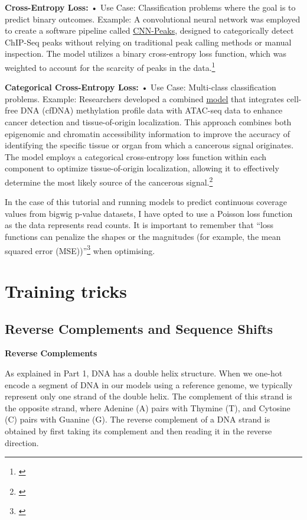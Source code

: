 \documentclass[
]{book}
\begin{document}
\textbf{Cross-Entropy Loss:}
• Use Case: Classification problems where the goal is to predict binary outcomes.
Example: A convolutional neural network was employed to create a software pipeline called \href{https://www.nature.com/articles/s41598-020-64655-4}{CNN-Peaks}, designed to categorically detect ChIP-Seq peaks without relying on traditional peak calling methods or manual inspection. The model utilizes a binary cross-entropy loss function, which was weighted to account for the scarcity of peaks in the data.\footnote{\citet{oh2020}}

\textbf{Categorical Cross-Entropy Loss:}
• Use Case: Multi-class classification problems.
Example: Researchers developed a combined \href{https://www.ncbi.nlm.nih.gov/pmc/articles/PMC10085982/}{model} that integrates cell-free DNA (cfDNA) methylation profile data with ATAC-seq data to enhance cancer detection and tissue-of-origin localization. This approach combines both epigenomic and chromatin accessibility information to improve the accuracy of identifying the specific tissue or organ from which a cancerous signal originates. The model employs a categorical cross-entropy loss function within each component to optimize tissue-of-origin localization, allowing it to effectively determine the most likely source of the cancerous signal.\footnote{\citet{bae2017}}

In the case of this tutorial and running models to predict continuous coverage values from bigwig p-value datasets, I have opted to use a Poisson loss function as the data represents read counts. It is important to remember that ``loss functions can penalize the shapes or the magnitudes (for example, the mean squared error (MSE))''\footnote{\citet{toneyan2022}} when optimising.

\chapter{Training tricks}\label{training-tricks}

\section{Reverse Complements and Sequence Shifts}\label{reverse-complements-and-sequence-shifts}

\textbf{Reverse Complements}

As explained in Part 1, DNA has a double helix structure. When we one-hot encode a segment of DNA in our models using a reference genome, we typically represent only one strand of the double helix. The complement of this strand is the opposite strand, where Adenine (A) pairs with Thymine (T), and Cytosine (C) pairs with Guanine (G). The reverse complement of a DNA strand is obtained by first taking its complement and then reading it in the reverse direction.
\end{document}
